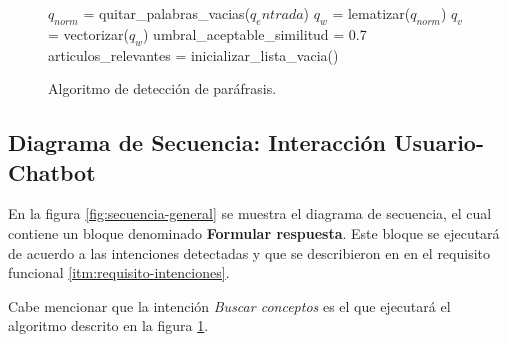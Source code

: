 \begin{figure}
    \begin{algorithm}[H]
        \SetAlgoLined

        
        $q_{norm}$ = quitar\_palabras\_vacias($q_entrada$)\;
        $q_w$ = lematizar($q_{norm}$)\;
        $q_v$ = vectorizar($q_w$)
        umbral\_aceptable\_similitud = 0.7\;
        articulos\_relevantes = inicializar\_lista\_vacia()\;
        \caption{Algoritmo de detección de paráfrasis.}
    \end{algorithm}
    \label{fig:algoritmo-deteccion-parafrasis}
\end{figure}

\newpage

\subsection{Diagrama de Secuencia: Interacción Usuario-Chatbot}

En la figura \ref{fig:secuencia-general} se muestra el diagrama de secuencia, el cual contiene un bloque denominado \textbf{Formular respuesta}. Este bloque se ejecutará de acuerdo a las intenciones detectadas y que se describieron en en el requisito funcional \ref{itm:requisito-intenciones}.


Cabe mencionar que la intención \textit{Buscar conceptos} es el que ejecutará el algoritmo descrito en la figura \ref{fig:algoritmo-deteccion-parafrasis}.

